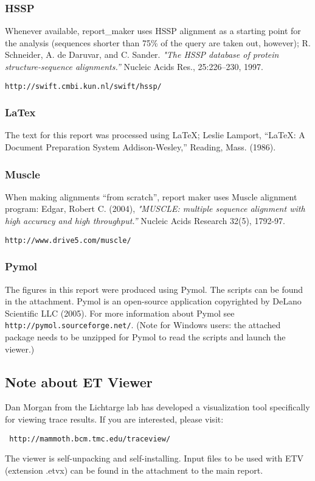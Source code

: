 \subsubsection{\bf HSSP}
 Whenever available, report\_maker uses HSSP alignment as a starting point for the analysis
(sequences shorter than 75\% of the query are taken out, however); 
R. Schneider, A. de Daruvar, and C. Sander. 
\emph {"The HSSP database of protein structure-sequence alignments.''} Nucleic Acids Res., 25:226--230, 1997.
\begin{verbatim}http://swift.cmbi.kun.nl/swift/hssp/\end{verbatim}
%
\subsubsection{\bf LaTex}
The text for this report was processed using \LaTeX;
 Leslie Lamport, ``LaTeX: A Document Preparation System
Addison-Wesley,'' Reading, Mass. (1986).
%
\subsubsection{\bf Muscle}
When making alignments ``from scratch'', report maker uses Muscle  alignment program:
Edgar, Robert C. (2004), 
\emph {"MUSCLE: multiple sequence alignment with high accuracy and high throughput.''}
Nucleic Acids Research 32(5), 1792-97.
\begin{verbatim}http://www.drive5.com/muscle/\end{verbatim}
%
\subsubsection{\bf Pymol}
The figures in this report were produced using Pymol. The scripts can be found in the 
attachment. Pymol is an open-source application copyrighted by DeLano Scientific LLC (2005).
 For more information about Pymol see {\tt http://pymol.sourceforge.net/}.
{\small(Note for Windows users: the attached package needs to be unzipped for Pymol
to read the scripts and launch the viewer.)}

\subsection{Note about ET Viewer}
 Dan Morgan from the Lichtarge lab has developed a visualization tool specifically for
viewing trace results. If you are interested, please visit:
\begin{verbatim} http://mammoth.bcm.tmc.edu/traceview/ \end{verbatim}
The viewer is self-unpacking and self-installing.
Input files to be used with ETV (extension .etvx) can be found in the attachment to the main report.


